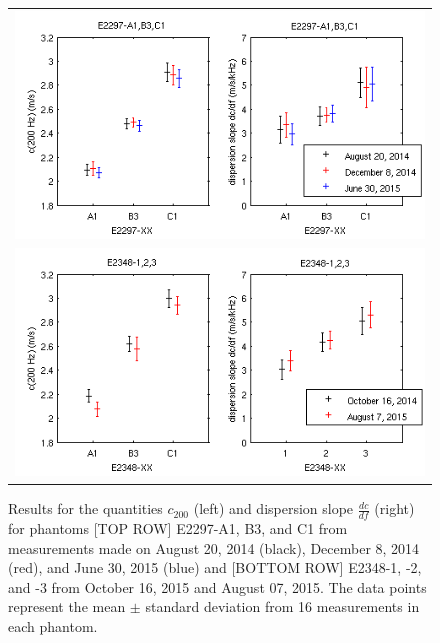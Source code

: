 \begin{figure}[htb!]
    \centering
    \begin{tabular}{c}
        \includegraphics[width=0.75\linewidth]{figs/phase2_longitudinal_stability.png} \\
        \includegraphics[width=0.75\linewidth]{figs/phaseIIset2_temporal_stability.png} \\
    \end{tabular}
    \caption{Results for the quantities $c_{200}$ (left) and dispersion slope
        $\frac{dc}{df}$ (right) for phantoms [TOP ROW] E2297-A1, B3, and C1
        from measurements made on August 20, 2014 (black), December 8, 2014
        (red), and June 30, 2015 (blue) and [BOTTOM ROW] E2348-1, -2, and -3
        from October 16, 2015 and August 07, 2015. The data points represent
        the mean $\pm$ standard deviation from 16 measurements in each
        phantom.} \label{fig:phase2_longitudinal_stability}
\end{figure}
